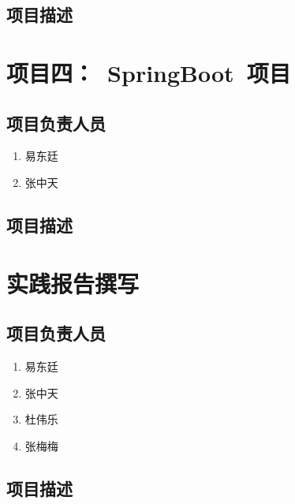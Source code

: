 \subsection{项目描述}

\section{项目四：~SpringBoot~项目}
\subsection{项目负责人员}
\begin{enumerate}
    \item{易东廷}
    \item{张中天}
\end{enumerate}
\subsection{项目描述}

\section{实践报告撰写}
\subsection{项目负责人员}
\begin{enumerate}
    \item{易东廷}
    \item{张中天}
    \item{杜伟乐}
    \item{张梅梅}
\end{enumerate}
\subsection{项目描述}